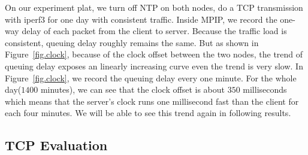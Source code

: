On our experiment plat, we turn off NTP on both nodes, do a TCP transmission with iperf3 for one day with consistent traffic. Inside MPIP, we record the one-way delay of each packet from the client to server. Because the traffic load is consistent, queuing delay roughly remains the same. But as shown in Figure~\ref{fig.clock}, because of the clock offset between the two nodes, the trend of queuing delay exposes an linearly increasing curve even the trend is very slow. In Figure~\ref{fig.clock}, we record the queuing delay every one minute. For the whole day($1400$ minutes), we can see that the clock offset is about $350$ milliseconds which means that the server's clock runs one millisecond fast than the client for each four minutes. We will be able to see this trend again in following results.

\begin{figure}
\caption{}
\label{fig.clockandoutoforder}
\end{figure}


\subsection{TCP Evaluation}
\label{sec:tcp}

